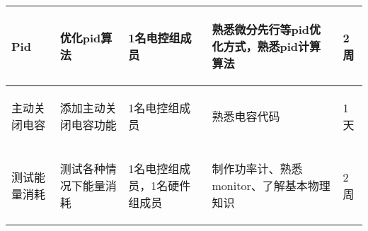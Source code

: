 \begin{longtable}{ p{2cm} | p{3cm} | p{3cm} | p{4.8cm} | p{2cm} |}
    \hline
        \begin{center}
            Pid
        \end{center} &
        \begin{center}
            优化pid算法
        \end{center} &
        \begin{center}
            1名电控组成员
        \end{center} &
        \begin{center}
            熟悉微分先行等pid优化方式，熟悉pid计算算法
        \end{center} &
        \begin{center}
            2周
        \end{center}\\

    \hline
    
        \begin{center}
            主动关闭电容
        \end{center} &
        \begin{center}
            添加主动关闭电容功能
        \end{center} &
        \begin{center}
            1名电控组成员
        \end{center} &
        \begin{center}
            熟悉电容代码
        \end{center} &
        \begin{center}
            1天
        \end{center} \\
        
    \hline
    
        \begin{center}
            测试能量消耗
        \end{center} &
        \begin{center}
            测试各种情况下能量消耗
        \end{center} &
        \begin{center}
            1名电控组成员，1名硬件组成员
        \end{center} &
        \begin{center}
            制作功率计、熟悉monitor、了解基本物理知识
        \end{center} &
        \begin{center}
            2周
        \end{center}\\


\end{longtable}
